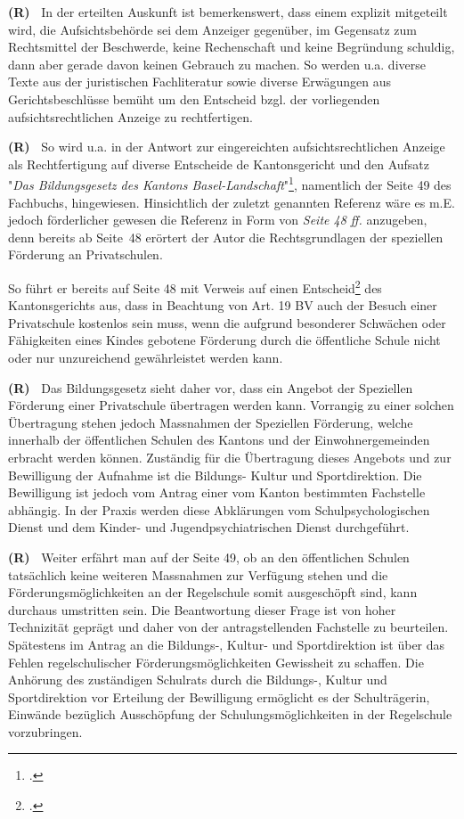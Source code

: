 \documentclass[paper=a4,fontsize=12pt, oneside, numbers=noenddot]{scrbook}
\newcounter{rz}
\newcommand{\Rz}{
	\addtocounter{rz}{1}\textbf{(R\arabic{rz})~}
}
\begin{document}
\Rz In der erteilten Auskunft ist bemerkenswert, dass einem  explizit mitgeteilt wird, die Aufsichtsbehörde sei dem Anzeiger gegenüber, im Gegensatz zum Rechtsmittel der Beschwerde, keine Rechenschaft und keine Begründung schuldig, dann aber gerade davon keinen Gebrauch zu machen. So werden u.a. diverse Texte aus der juristischen Fachliteratur sowie diverse Erwägungen aus Gerichtsbeschlüsse bemüht um den Entscheid bzgl. der vorliegenden aufsichtsrechtlichen Anzeige zu rechtfertigen.

\Rz So wird u.a. in der Antwort zur eingereichten aufsichtsrechtlichen Anzeige als Rechtfertigung auf diverse Entscheide de Kantonsgericht und den Aufsatz "\textit{Das Bildungsgesetz des Kantons Basel-Landschaft}"\footcite[Seite 34 ff.]{2007:Biaggini:StaatsVerwaltungsrechBL}, namentlich der Seite 49 des Fachbuchs, hingewiesen. Hinsichtlich der zuletzt genannten Referenz wäre es m.E. jedoch förderlicher gewesen die Referenz in Form von \textit{Seite 48 ff.}  anzugeben, denn bereits ab Seite~48 erörtert der Autor die Rechtsgrundlagen der speziellen Förderung an Privatschulen. 

So führt er bereits auf Seite 48 mit Verweis auf einen Entscheid\footcite{KGE8100498} des Kantonsgerichts aus, dass in Beachtung von Art. 19 BV auch der Besuch einer Privatschule kostenlos sein muss, wenn die aufgrund besonderer Schwächen oder Fähigkeiten eines Kindes gebotene Förderung durch die öffentliche Schule nicht oder nur unzureichend gewährleistet werden kann.    

\Rz Das Bildungsgesetz sieht daher vor, dass ein Angebot der Speziellen Förderung einer Privatschule übertragen werden kann. Vorrangig zu einer solchen Übertragung stehen jedoch Massnahmen der Speziellen Förderung, welche innerhalb der öffentlichen Schulen des Kantons und der Einwohnergemeinden erbracht werden können. Zuständig für die Übertragung dieses Angebots und zur Bewilligung der Aufnahme ist die Bildungs- Kultur und Sportdirektion. Die Bewilligung ist jedoch vom Antrag einer vom Kanton bestimmten Fachstelle abhängig. In der Praxis werden diese Abklärungen vom Schulpsychologischen Dienst und dem Kinder- und Jugendpsychiatrischen Dienst durchgeführt.

\Rz Weiter erfährt man auf der Seite 49, ob an den öffentlichen Schulen tatsächlich keine weiteren Massnahmen zur Verfügung stehen und die Förderungsmöglichkeiten an der Regelschule somit ausgeschöpft sind, kann durchaus umstritten sein. Die Beantwortung dieser Frage ist von hoher Technizität geprägt und daher von der antragstellenden Fachstelle zu beurteilen. Spätestens im Antrag an die Bildungs-, Kultur- und Sportdirektion ist über das Fehlen regelschulischer Förderungsmöglichkeiten Gewissheit zu schaffen. Die Anhörung des zuständigen Schulrats durch die Bildungs-, Kultur und Sportdirektion vor Erteilung der Bewilligung ermöglicht es der Schulträgerin, Einwände bezüglich
Ausschöpfung der Schulungsmöglichkeiten in der Regelschule vorzubringen.
\end{document}
